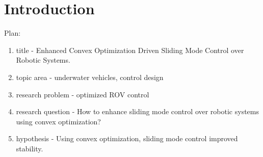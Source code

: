 \chapter{Introduction}
\label{chap:intro}

Plan:
\begin{enumerate}
    \item title - Enhanced Convex Optimization Driven Sliding Mode Control over Robotic Systems.
    \item topic area - underwater vehicles, control design
    \item research problem - optimized ROV control
    \item research question - How to enhance sliding mode control over robotic systems using convex optimization?
    \item hypothesis - Using convex optimization, sliding mode control improved stability.
\end{enumerate}




